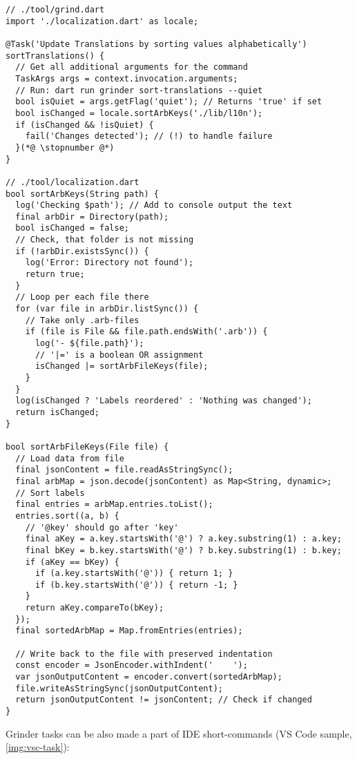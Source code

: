 \begin{lstlisting}
// ./tool/grind.dart
import './localization.dart' as locale;

@Task('Update Translations by sorting values alphabetically')
sortTranslations() {
  // Get all additional arguments for the command
  TaskArgs args = context.invocation.arguments;
  // Run: dart run grinder sort-translations --quiet
  bool isQuiet = args.getFlag('quiet'); // Returns 'true' if set
  bool isChanged = locale.sortArbKeys('./lib/l10n');
  if (isChanged && !isQuiet) {
    fail('Changes detected'); // (!) to handle failure
  }(*@ \stopnumber @*)
}

// ./tool/localization.dart
bool sortArbKeys(String path) {
  log('Checking $path'); // Add to console output the text
  final arbDir = Directory(path);
  bool isChanged = false;
  // Check, that folder is not missing
  if (!arbDir.existsSync()) {
    log('Error: Directory not found');
    return true;
  }
  // Loop per each file there
  for (var file in arbDir.listSync()) {
    // Take only .arb-files
    if (file is File && file.path.endsWith('.arb')) {
      log('- ${file.path}');
      // '|=' is a boolean OR assignment
      isChanged |= sortArbFileKeys(file);
    }
  }
  log(isChanged ? 'Labels reordered' : 'Nothing was changed');
  return isChanged;
}

bool sortArbFileKeys(File file) {
  // Load data from file
  final jsonContent = file.readAsStringSync();
  final arbMap = json.decode(jsonContent) as Map<String, dynamic>;
  // Sort labels
  final entries = arbMap.entries.toList();
  entries.sort((a, b) {
    // '@key' should go after 'key'
    final aKey = a.key.startsWith('@') ? a.key.substring(1) : a.key;
    final bKey = b.key.startsWith('@') ? b.key.substring(1) : b.key;
    if (aKey == bKey) {
      if (a.key.startsWith('@')) { return 1; }
      if (b.key.startsWith('@')) { return -1; }
    }
    return aKey.compareTo(bKey);
  });
  final sortedArbMap = Map.fromEntries(entries);

  // Write back to the file with preserved indentation
  const encoder = JsonEncoder.withIndent('    ');
  var jsonOutputContent = encoder.convert(sortedArbMap);
  file.writeAsStringSync(jsonOutputContent);
  return jsonOutputContent != jsonContent; // Check if changed
}
\end{lstlisting}

\noindent Grinder tasks can be also made a part of IDE short-commands (VS Code sample, \cref{img:vsc-task}):


